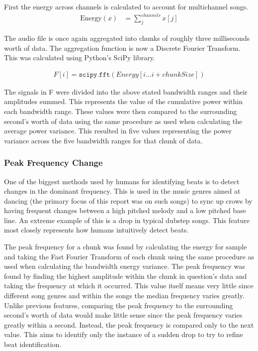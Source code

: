 \documentclass[12pt]{article}
\begin{document}
First the energy across channels is calculated to account for multichannel songs.
\begin{align*}
 	\text{Energy}(x) &= \sum_j^{channels} x[j]
 \end{align*}

 The audio file is once again aggregated into chunks of roughly three milliseconds worth of data. The aggregation function is now a Discrete Fourier Transform. This was calculated using Python's SciPy library.

 \begin{align*}
 	F[i] =  \texttt{scipy.fft}(Energy[i \dots i+chunkSize])
 \end{align*}

The signals in F were divided into the above stated bandwidth ranges and their amplitudes summed. This represents the value of the cumulative power within each bandwidth range. These values were then compared to the surrounding second's worth of data using the same procedure as used when calculating the average power variance. This resulted in five values representing the power variance across the five bandwidth ranges for that chunk of data.

\subsubsection{Peak Frequency Change}
One of the biggest methods used by humans for identifying beats is to detect changes in the dominant frequency. This is used in the music genres aimed at dancing (the primary focus of this report was on such songs) to sync up crows by having frequent changes between a high pitched melody and a low pitched base line. An extreme example of this is a drop in typical dubstep songs. This feature most closely represents how humans intuitively detect beats.

The peak frequency for a chunk was found by calculating the energy for sample and taking the Fast Fourier Transform of each chunk using the same procedure as used when calculating the bandwidth energy variance. The peak frequency was found by finding the highest amplitude within the chunk in question's data and taking the frequency at which it occurred. This value itself means very little since different song genres and within the songs the median frequency varies greatly. Unlike previous features, comparing the peak frequency to the surrounding second's worth of data would make little sense since the peak frequency varies greatly within a second. Instead, the peak frequency is compared only to the next value. This aims to identify only the instance of a sudden drop to try to refine beat identification.
\end{document}
